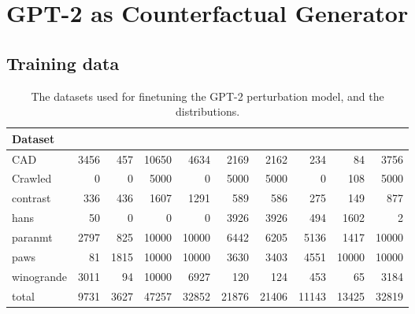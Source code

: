 \section{GPT-2 as Counterfactual Generator}
\label{appendix:train_data}

\subsection{Training data}
\begin{table*}
\small
\centering
\setlength{\tabcolsep}{3.5pt}
\begin{tabular}{lrrrrrrrrr}
\toprule
\textbf{Dataset} & \textbf{\ctrltag{negation}} & \textbf{\ctrltag{quantifier}} & \textbf{\ctrltag{leixcal}} & \textbf{\ctrltag{resemantic}} & \textbf{\ctrltag{insert}} & \textbf{\ctrltag{delete}} & \textbf{\ctrltag{restructure}} & \textbf{\ctrltag{shuffle}} & \emph{\ctrltag{global}} \\ 
\midrule
        CAD &      3456 &         457 &    10650 &        4634 &    2169 &    2162 &          234 &       84 &    3756 \\
    Crawled &         0 &           0 &     5000 &           0 &    5000 &    5000 &            0 &      108 &    5000 \\
   contrast &       336 &         436 &     1607 &        1291 &     589 &     586 &          275 &      149 &     877 \\
       hans &        50 &           0 &        0 &           0 &    3926 &    3926 &          494 &     1602 &       2 \\
    paranmt &      2797 &         825 &    10000 &       10000 &    6442 &    6205 &         5136 &     1417 &   10000 \\
       paws &        81 &        1815 &    10000 &       10000 &    3630 &    3403 &         4551 &    10000 &   10000 \\
 winogrande &      3011 &          94 &    10000 &        6927 &     120 &     124 &          453 &       65 &    3184 \\
      total &      9731 &        3627 &    47257 &       32852 &   21876 &   21406 &        11143 &    13425 &   32819 \\
\bottomrule
\end{tabular}
\caption{The datasets used for finetuning the GPT-2 perturbation model, and the \tagstr distributions.}
\label{table:gpt_train_stats}
\end{table*}


